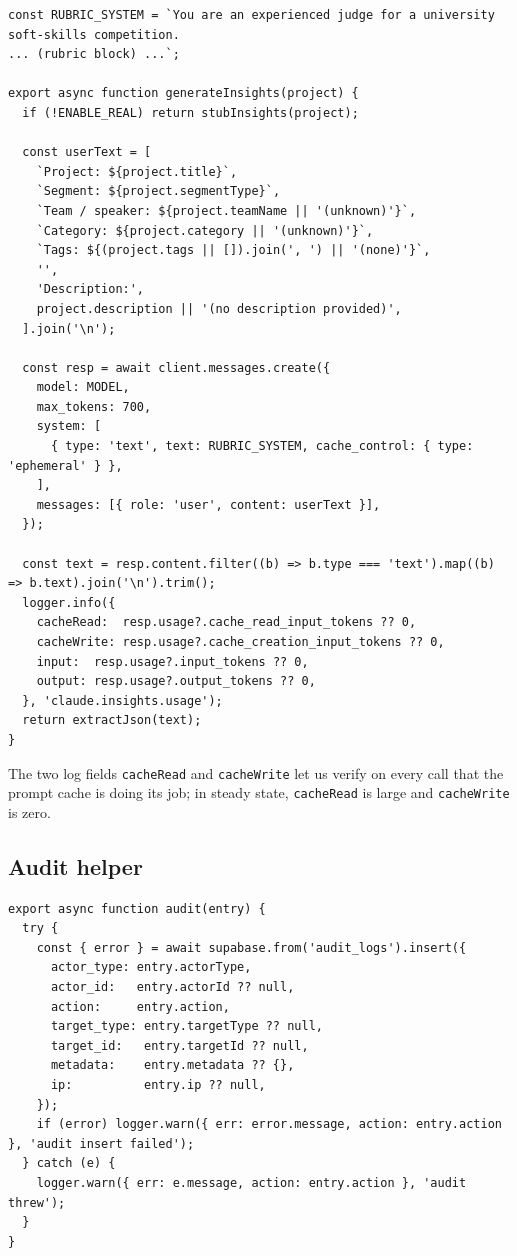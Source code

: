 \begin{lstlisting}[caption={\texttt{server/services/claude.js} (the message create)},label={lst:claude}]
const RUBRIC_SYSTEM = `You are an experienced judge for a university soft-skills competition.
... (rubric block) ...`;

export async function generateInsights(project) {
  if (!ENABLE_REAL) return stubInsights(project);

  const userText = [
    `Project: ${project.title}`,
    `Segment: ${project.segmentType}`,
    `Team / speaker: ${project.teamName || '(unknown)'}`,
    `Category: ${project.category || '(unknown)'}`,
    `Tags: ${(project.tags || []).join(', ') || '(none)'}`,
    '',
    'Description:',
    project.description || '(no description provided)',
  ].join('\n');

  const resp = await client.messages.create({
    model: MODEL,
    max_tokens: 700,
    system: [
      { type: 'text', text: RUBRIC_SYSTEM, cache_control: { type: 'ephemeral' } },
    ],
    messages: [{ role: 'user', content: userText }],
  });

  const text = resp.content.filter((b) => b.type === 'text').map((b) => b.text).join('\n').trim();
  logger.info({
    cacheRead:  resp.usage?.cache_read_input_tokens ?? 0,
    cacheWrite: resp.usage?.cache_creation_input_tokens ?? 0,
    input:  resp.usage?.input_tokens ?? 0,
    output: resp.usage?.output_tokens ?? 0,
  }, 'claude.insights.usage');
  return extractJson(text);
}
\end{lstlisting}

The two log fields \texttt{cacheRead} and \texttt{cacheWrite} let us
verify on every call that the prompt cache is doing its job; in steady
state, \texttt{cacheRead} is large and \texttt{cacheWrite} is zero.

\subsection{Audit helper}

\begin{lstlisting}[caption={\texttt{server/utils/audit.js}},label={lst:audit}]
export async function audit(entry) {
  try {
    const { error } = await supabase.from('audit_logs').insert({
      actor_type: entry.actorType,
      actor_id:   entry.actorId ?? null,
      action:     entry.action,
      target_type: entry.targetType ?? null,
      target_id:   entry.targetId ?? null,
      metadata:    entry.metadata ?? {},
      ip:          entry.ip ?? null,
    });
    if (error) logger.warn({ err: error.message, action: entry.action }, 'audit insert failed');
  } catch (e) {
    logger.warn({ err: e.message, action: entry.action }, 'audit threw');
  }
}
\end{lstlisting}

